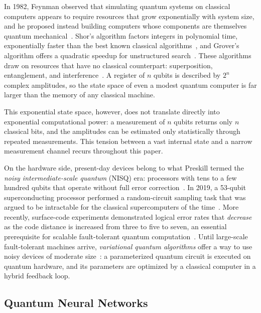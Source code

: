 \documentclass[12pt]{article}
\numberwithin{equation}{section}  %
\begin{document}
In 1982, Feynman observed that simulating quantum systems on classical computers appears to require resources that grow exponentially with system size, and he proposed instead building computers whose components are themselves quantum mechanical~\cite{feynman1982simulating}. Shor's algorithm factors integers in polynomial time, exponentially faster than the best known classical algorithms~\cite{shor1997polynomial}, and Grover's algorithm offers a quadratic speedup for unstructured search~\cite{grover1996fast}. These algorithms draw on resources that have no classical counterpart: superposition, entanglement, and interference~\cite{nielsen2010quantum}. A register of $n$ qubits is described by $2^n$ complex amplitudes, so the state space of even a modest quantum computer is far larger than the memory of any classical machine.

This exponential state space, however, does not translate directly into exponential computational power: a measurement of $n$ qubits returns only $n$ classical bits, and the amplitudes can be estimated only statistically through repeated measurements. This tension between a vast internal state and a narrow measurement channel recurs throughout this paper.

On the hardware side, present-day devices belong to what Preskill termed the \emph{noisy intermediate-scale quantum} (NISQ) era: processors with tens to a few hundred qubits that operate without full error correction~\cite{preskill2018quantum}. In 2019, a 53-qubit superconducting processor performed a random-circuit sampling task that was argued to be intractable for the classical supercomputers of the time~\cite{arute2019quantum}. More recently, surface-code experiments demonstrated logical error rates that \emph{decrease} as the code distance is increased from three to five to seven, an essential prerequisite for scalable fault-tolerant quantum computation~\cite{google2025quantum}. Until large-scale fault-tolerant machines arrive, \emph{variational quantum algorithms} offer a way to use noisy devices of moderate size~\cite{cerezo2021variational}: a parameterized quantum circuit is executed on quantum hardware, and its parameters are optimized by a classical computer in a hybrid feedback loop.

\subsection{Quantum Neural Networks}
\label{sec:intro_qnn}
\end{document}
